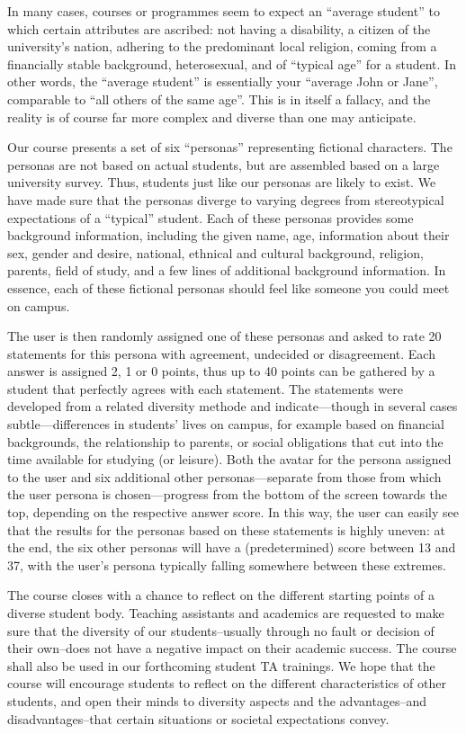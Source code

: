\documentclass[sigconf,anonymous]{acmart}
\begin{document}
In many cases, courses or programmes seem to expect an ``average student'' to which
certain attributes are ascribed: not having  a disability, a citizen of the university's nation,
adhering to the predominant local religion, coming from a financially stable background,
heterosexual, and of ``typical age'' for a student. In other words, the ``average student''
is essentially your ``average John or Jane'', comparable to ``all others of the same age''.
This is in itself a fallacy, and the reality is of course far more complex and diverse than
one may anticipate.

Our course presents a set of six ``personas'' representing fictional characters. The
personas are not based on actual students, but are assembled based on a large
university survey. Thus, students just like our personas are likely to exist.
We have made sure that the personas diverge to varying degrees from stereotypical expectations
of a ``typical'' student. Each of these personas provides some background information, including the
given name, age, information about their sex, gender and desire, national, ethnical and
cultural background, religion, parents, field of study, and a few lines of additional
background information. In essence, each of these fictional personas
should feel like someone you could meet on campus.

The user is then randomly assigned one of these personas and asked to rate 20
statements for this persona with agreement, undecided or disagreement. Each answer
is assigned 2, 1 or 0 points, thus up to 40 points can be gathered by a student
that perfectly agrees with each statement. The statements were developed from a
related diversity methode and indicate---though in several cases subtle---differences
in students' lives on campus, for example based on financial backgrounds, the relationship
to parents, or social obligations that cut into the time available for studying
(or leisure). Both the avatar for the persona assigned to the user  and six additional
other personas---separate from those from which the user persona is chosen---progress
from the bottom of the screen towards the top, depending on the respective answer
score. In this way, the user can easily see that the results for the personas based
on these statements is highly uneven: at the end, the six other personas will have a
(predetermined) score between 13 and 37, with the user's persona typically falling
somewhere between these extremes.

The course closes with a chance to reflect on the different starting points of a diverse
student body. Teaching assistants and academics are requested to make sure that the diversity of our
students--usually through no fault or decision of their own--does not have a negative
impact on their academic success. The course shall also be used in our forthcoming
student TA trainings. We hope that the course will encourage students to reflect
on the different characteristics of other students, and open their minds to diversity aspects and the
advantages--and disadvantages--that certain situations or societal expectations convey.
\end{document}
